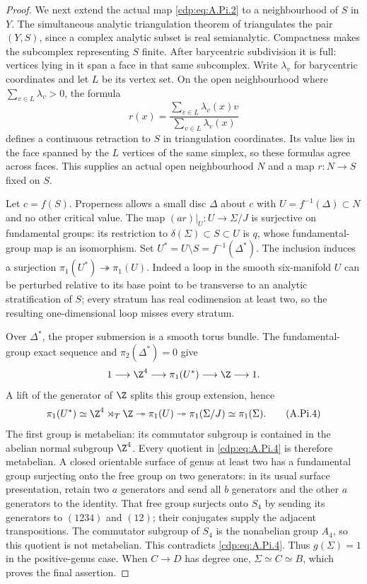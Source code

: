 \begin{proof}
We next extend the actual map \eqref{cdp:eq:A.Pi.2} to a neighbourhood
of $S$ in $Y$. The simultaneous analytic triangulation
theorem of \cite[\S3, Theorem~2, p.~464]{Lojasiewicz1964}
triangulates the pair $(Y,S)$, since a complex analytic
subset is real semianalytic. Compactness makes the
subcomplex representing $S$ finite. After barycentric
subdivision it is full: vertices lying in it span a
face in that same subcomplex. Write $\lambda_v$ for
barycentric coordinates and let $L$ be its vertex set.
On the open neighbourhood where $\sum_{v\in L}\lambda_v>0$,
the formula
\[
 r(x)=\frac{\sum_{v\in L}\lambda_v(x)v}
                  {\sum_{v\in L}\lambda_v(x)}       \tag{A.Pi.3}\label{cdp:eq:A.Pi.3}
\]
defines a continuous retraction to $S$ in triangulation
coordinates. Its value lies in the face spanned by the
$L$ vertices of the same simplex, so these formulas
agree across faces. This supplies an actual open
neighbourhood $N$ and a map $r:N\to S$ fixed on $S$.

Let $c=f(S)$. Properness allows a small disc $\Delta$
about $c$ with $U=f^{-1}(\Delta)\subset N$ and no other
critical value. The map $(ar)|_U:U\to\Sigma/J$ is
surjective on fundamental groups: its restriction to
$\delta(\Sigma)\subset S\subset U$ is $q$, whose
fundamental-group map is an isomorphism.
Set $U^*=U\setminus S=f^{-1}(\Delta^*)$.
The inclusion induces a surjection
$\pi_1(U^*)\twoheadrightarrow\pi_1(U)$.
Indeed a loop in the smooth six-manifold $U$ can be
perturbed relative to its base point to be transverse
to an analytic stratification of $S$; every stratum
has real codimension at least two, so the resulting
one-dimensional loop misses every stratum.

Over $\Delta^*$, the proper submersion is a smooth
torus bundle. The fundamental-group exact sequence
and $\pi_2(\Delta^*)=0$ give
\[
 1\longrightarrow\Z^4\longrightarrow\pi_1(U^*)
       \longrightarrow\Z\longrightarrow1.
\]
A lift of the generator of $\Z$ splits this group
extension, hence
\[
 \pi_1(U^*)\simeq\Z^4\rtimes_T\Z
 \twoheadrightarrow\pi_1(U)
 \twoheadrightarrow\pi_1(\Sigma/J)
 \simeq\pi_1(\Sigma).                             \tag{A.Pi.4}\label{cdp:eq:A.Pi.4}
\]
The first group is metabelian: its commutator subgroup
is contained in the abelian normal subgroup $\Z^4$.
Every quotient in \eqref{cdp:eq:A.Pi.4} is therefore metabelian.
A closed orientable surface of genus at least two
has a fundamental group surjecting onto the free
group on two generators: in its usual surface
presentation, retain two $a$ generators and send all
$b$ generators and the other $a$ generators to the
identity. That free group surjects onto $S_4$ by
sending its generators to $(1234)$ and $(12)$;
their conjugates supply the adjacent transpositions.
The commutator subgroup of $S_4$ is the nonabelian
group $A_4$, so this quotient is not metabelian.
This contradicts \eqref{cdp:eq:A.Pi.4}. Thus $g(\Sigma)=1$ in the
positive-genus case. When $C\to D$ has degree one,
$\Sigma\simeq C\simeq B$, which proves the final
assertion.
\end{proof}



